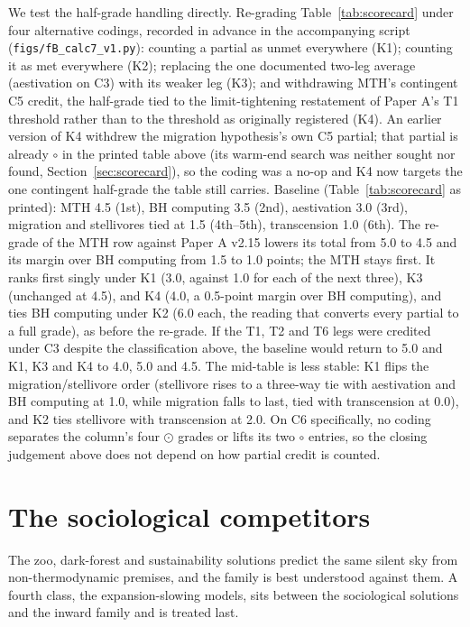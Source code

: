 \documentclass[11pt]{article}
\newcommand{\shalf}{\ensuremath{\odot}} %
\newcommand{\snone}{\ensuremath{\circ}}     %
\begin{document}
We test the half-grade handling directly. Re-grading Table~\ref{tab:scorecard} under four alternative codings, recorded in advance in the accompanying script (\texttt{figs/fB\_calc7\_v1.py}): counting a partial as unmet everywhere (K1); counting it as met everywhere (K2); replacing the one documented two-leg average (aestivation on C3) with its weaker leg (K3); and withdrawing MTH's contingent C5 credit, the half-grade tied to the limit-tightening restatement of Paper A's T1 threshold rather than to the threshold as originally registered (K4). An earlier version of K4 withdrew the migration hypothesis's own C5 partial; that partial is already \snone{} in the printed table above (its warm-end search was neither sought nor found, Section~\ref{sec:scorecard}), so the coding was a no-op and K4 now targets the one contingent half-grade the table still carries. Baseline (Table~\ref{tab:scorecard} as printed): MTH 4.5 (1st), BH computing 3.5 (2nd), aestivation 3.0 (3rd), migration and stellivores tied at 1.5 (4th--5th), transcension 1.0 (6th). The re-grade of the MTH row against Paper A v2.15 lowers its total from 5.0 to 4.5 and its margin over BH computing from 1.5 to 1.0 points; the MTH stays first. It ranks first singly under K1 (3.0, against 1.0 for each of the next three), K3 (unchanged at 4.5), and K4 (4.0, a 0.5-point margin over BH computing), and ties BH computing under K2 (6.0 each, the reading that converts every partial to a full grade), as before the re-grade. If the T1, T2 and T6 legs were credited under C3 despite the classification above, the baseline would return to 5.0 and K1, K3 and K4 to 4.0, 5.0 and 4.5. The mid-table is less stable: K1 flips the migration/stellivore order (stellivore rises to a three-way tie with aestivation and BH computing at 1.0, while migration falls to last, tied with transcension at 0.0), and K2 ties stellivore with transcension at 2.0. On C6 specifically, no coding separates the column's four \shalf{} grades or lifts its two \snone{} entries, so the closing judgement above does not depend on how partial credit is counted.

\section{The sociological competitors}
\label{sec:sociological}

The zoo, dark-forest and sustainability solutions predict the same silent sky from non-thermodynamic premises, and the family is best understood against them. A fourth class, the expansion-slowing models, sits between the sociological solutions and the inward family and is treated last.
\end{document}
